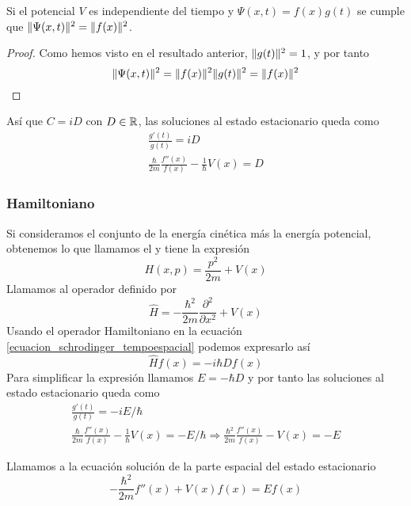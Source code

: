 \begin{resultado}
    Si el potencial $V$ es independiente del tiempo y $\Psi(x,t)=f(x)g(t)$ se cumple que $\lVert\Psi(x,t)\rVert^2=\lVert f(x)\rVert^2$.
\end{resultado}
\begin{proof}
    Como hemos visto en el resultado anterior, $\lVert g(t)\rVert^2=1$, y por tanto
    \begin{equation}
        \label{probabilidad_atemporal}
        \lVert\Psi(x,t)\rVert^2=\lVert f(x)\rVert^2\lVert g(t)\rVert^2=\lVert f(x)\rVert^2
    \end{equation}
\end{proof}
Así que $C=iD$ con $D\in\mathbb{R}$, las soluciones al estado estacionario queda como
\begin{gather*}
    \frac{g'(t)}{g(t)}=iD
    \\
    \frac{\hbar}{2m}\frac{f''(x)}{f(x)}-\frac{1}{\hbar}V(x)=D
\end{gather*}

\subsubsection{Hamiltoniano}
Si consideramos el conjunto de la energía cinética más la energía potencial, obtenemos lo que llamamos el  y tiene la expresión
\begin{equation}
    \label{halmitoniano}
    H(x,p)=\frac{p^2}{2m}+V(x)
\end{equation}
Llamamos  al operador definido por
\begin{equation}
    \label{operador_hamiltoniano}
    \widehat{H}=-\frac{\hbar^2}{2m}\frac{\partial^2}{\partial x^2}+V(x)
\end{equation}
Usando el operador Hamiltoniano en la ecuación \ref{ecuacion_schrodinger_tempoespacial} podemos expresarlo así
\begin{equation*}
    \widehat{H}f(x)=-i\hbar Df(x)
\end{equation*}
Para simplificar la expresión llamamos $E=-\hbar D$ y por tanto las soluciones al estado estacionario queda como
\begin{gather*}
    \frac{g'(t)}{g(t)}=-iE/\hbar
    \\
    \frac{\hbar}{2m}\frac{f''(x)}{f(x)}-\frac{1}{\hbar}V(x)=-E/\hbar\Rightarrow \frac{\hbar^2}{2m}\frac{f''(x)}{f(x)}-V(x)=-E
\end{gather*}

\begin{definicion}
    Llamamos  a la ecuación solución de la parte espacial del estado estacionario
    \begin{equation}
        \label{ecuacion_schrodinger_tempoespacial}
        -\frac{\hbar^2}{2m}f''(x)+V(x)f(x)= Ef(x)
    \end{equation}
\end{definicion}

